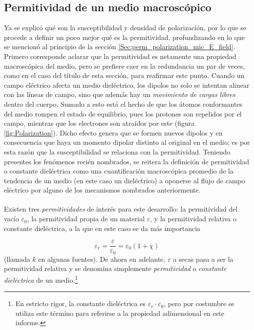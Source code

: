 \documentclass[12pt, twoside, onehalfspace, numbers, spanish]{ezthesis}
\numberwithin{equation}{section}
\begin{document}
\subsection{Permitividad de un medio macroscópico}\label{subsec:Macro_perm}
Ya se explicó qué son la susceptibilidad y densidad de polarización, por lo que se procede a definir un poco mejor qué es la permitividad, profundizando en lo que se mencionó al principio de la sección \ref{Sec:perm_polarization_mic_E_field}.
Primero corresponde aclarar que la permitividad es netamente una propiedad macroscópica del medio, pero se prefiere caer en la redundancia un par de veces, como en el caso del título de esta sección, para reafirmar este punto. Cuando un campo eléctrico afecta un medio dieléctrico, los dipolos no solo se intentan alinear con las líneas de campo, sino que además hay un \textit{movimiento de cargas libres} dentro del cuerpo. Sumado a esto está el hecho de que los átomos conformantes del medio rompen el estado de equilibrio, pues los protones son repelidos por el campo, mientras que los electrones son atraídos por este (figura \ref{fig:Polarization}). Dicho efecto genera que se formen nuevos dipolos y en consecuencia que haya un momento dipolar distinto al original en el medio; es por esta razón que la susceptibilidad se relaciona con la permitividad. Teniendo presentes los fenómenos recién nombrados, se reitera la definición de permitividad o constante dieléctrica como una cuantificación macroscópica promedio de la tendencia de un medio (en este caso un dieléctrico) a oponerse al flujo de campo eléctrico por alguno de los mecanismos nombrados anteriormente.\\\\
Existen tres \textit{permitividades} de interés para este desarrollo: la permitividad del vacío $\varepsilon_0$, la permitividad propia de un material $\varepsilon$, y la permitividad relativa o constante dieléctrica, a la que en este caso se da más importancia

\begin{equation}\label{eqn:Permittivity_definition}
\varepsilon_r = \frac{\varepsilon}{\varepsilon_0}=\varepsilon_0(1+\chi)
\end{equation}
\noindent
(llamada $k$ en algunas fuentes). De ahora en adelante, $\varepsilon$ a secas pasa a ser la permitividad relativa y se denomina simplemente \textit{permitividad} o \textit{constante dieléctrica} de un medio.\footnote{En estricto rigor, la constante dieléctrica es $\varepsilon_r\cdot\varepsilon_0$, pero por costumbre se utiliza este término para referirse a la propiedad adimensional en este informe.}
\end{document}
